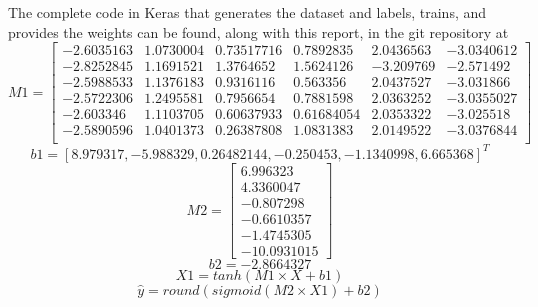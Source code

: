 \documentclass{article}                     %
\begin{document}
	The complete code in Keras that generates the dataset and labels, trains, and provides the weights can be found, along with this report, in the git repository at 
	\begin{equation}\label{eq:m1}
	M1 = \left[ \begin{array}{cccccc}
		-2.6035163 & 1.0730004 & 0.73517716 &  0.7892835 & 2.0436563 & -3.0340612 \\
		-2.8252845 & 1.1691521 & 1.3764652 & 1.5624126 & -3.209769 &	-2.571492  \\
		-2.5988533 & 1.1376183 & 0.9316116 & 0.563356  & 2.0437527 & -3.031866  \\
		-2.5722306 & 1.2495581 & 0.7956654 & 0.7881598 & 2.0363252 &	-3.0355027 \\
		-2.603346  & 1.1103705 & 0.60637933 & 0.61684054 & 2.0353322 & -3.025518 \\
		-2.5890596 & 1.0401373 & 0.26387808 & 1.0831383 & 2.0149522 &  -3.0376844 \\
	\end{array} \right]
	\end{equation}
	\begin{equation}\label{eq:b1}
	b1 = \left[8.979317  , -5.988329  ,  0.26482144, -0.250453  , -1.1340998 ,
	6.665368 \right]^T
	\end{equation}
	\begin{equation}\label{eq:m2}
	M2 = \left[\begin{array}{c}
	6.996323 \\
	  4.3360047\\
	 -0.807298\\
	 -0.6610357\\
	 -1.4745305\\
	-10.0931015
	\end{array}\right]
	\end{equation}
	\begin{equation}\label{eq:b2}
	b2 = -2.8664327
	\end{equation}
	\begin{equation}\label{eq:l1}
	X1 = tanh(M1 \times X + b1)
	\end{equation}
	\begin{equation}\label{eq:l2}
	\hat{y} = round(sigmoid(M2 \times X1) + b2)
	\end{equation}
\end{document}
